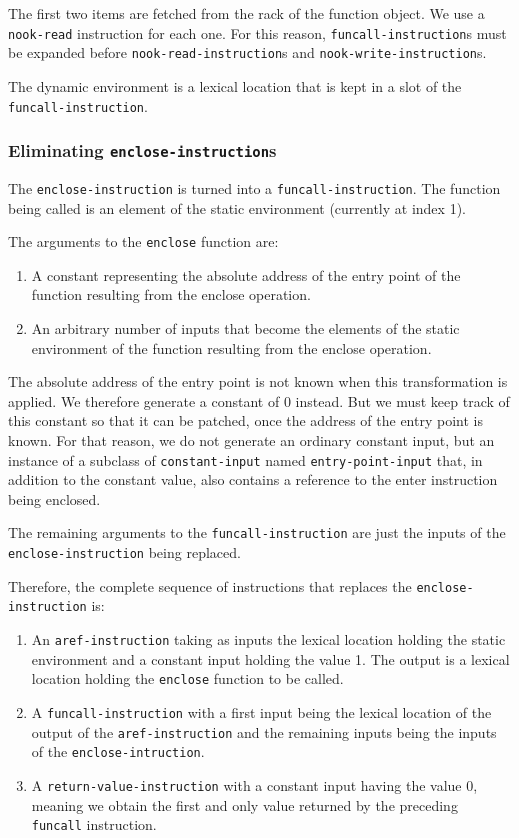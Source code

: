 The first two items are fetched from the rack of the function object.
We use a \texttt{nook-read} instruction for each one.  For this
reason, \texttt{funcall-instruction}s must be expanded before
\texttt{nook-read-instruction}s and \texttt{nook-write-instruction}s.

The dynamic environment is a lexical location that is kept in a slot
of the \texttt{funcall-instruction}.

\subsubsection{Eliminating \texttt{enclose-instruction}s}

The \texttt{enclose-instruction} is turned into a
\texttt{funcall-instruction}.  The function being called is an element
of the static environment (currently at index 1).

The arguments to the \texttt{enclose} function are:

\begin{enumerate}
\item A constant representing the absolute address of the entry point
  of the function resulting from the enclose operation.
\item An arbitrary number of inputs that become the elements of the
  static environment of the function resulting from the enclose
  operation.
\end{enumerate}

The absolute address of the entry point is not known when this
transformation is applied.  We therefore generate a constant of 0
instead.  But we must keep track of this constant so that it can be
patched, once the address of the entry point is known.  For that
reason, we do not generate an ordinary constant input, but an instance
of a subclass of \texttt{constant-input} named
\texttt{entry-point-input} that, in addition to the constant value,
also contains a reference to the enter instruction being enclosed.

The remaining arguments to the \texttt{funcall-instruction} are just
the inputs of the \texttt{enclose-instruction} being replaced.

Therefore, the complete sequence of instructions that replaces the
\texttt{enclose-instruction} is:

\begin{enumerate}
\item An \texttt{aref-instruction} taking as inputs the lexical
  location holding the static environment and a constant input holding
  the value 1.  The output is a lexical location holding the
  \texttt{enclose} function to be called.
\item A \texttt{funcall-instruction} with a first input being the
  lexical location of the output of the \texttt{aref-instruction} and
  the remaining inputs being the inputs of the
  \texttt{enclose-intruction}.
\item A \texttt{return-value-instruction} with a constant input having
  the value $0$, meaning we obtain the first and only value returned
  by the preceding \texttt{funcall} instruction.
\end{enumerate}

